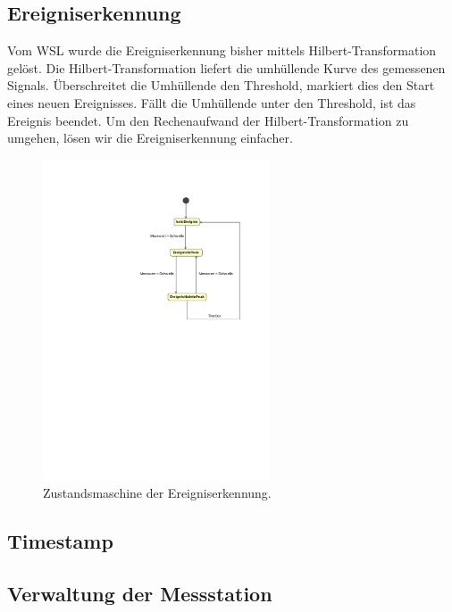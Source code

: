 \subsection{Ereigniserkennung}\label{subsec.sw_ereignis}
Vom WSL wurde die Ereigniserkennung bisher mittels Hilbert-Transformation gelöst. Die Hilbert-Transformation liefert die umhüllende Kurve des gemessenen Signals. Überschreitet die Umhüllende den Threshold, markiert dies den Start eines neuen Ereignisses. Fällt die Umhüllende unter den Threshold, ist das Ereignis beendet. Um den Rechenaufwand der Hilbert-Transformation zu umgehen, lösen wir die Ereigniserkennung einfacher.
\begin{figure}[H]
	\centering
		\includegraphics[width=0.6\textwidth]{images/magicdraw/Ereigniserkennung.pdf}
	\caption{Zustandsmaschine der Ereigniserkennung.}
	\label{fig.fsm_impact_detection}
\end{figure}


\subsection{Timestamp}\label{subsec.sw_timestamp}

\subsection{Verwaltung der Messstation}\label{subsec.sw_busverwaltung}

